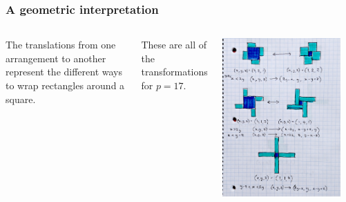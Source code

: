 \documentclass{beamer}
\begin{document}
\begin{frame}
	\frametitle{A geometric interpretation}
	\begin{columns}

	The translations from one arrangement to another represent the different ways to wrap
	rectangles around a square.

	\vspace{1ex}

	These are all of the transformations for $p=17$.


	\begin{center}
             \includegraphics[width=0.9\textwidth]{Zagier_involution_levels.jpg}
        \end{center}
	
	\end{columns}
\end{frame}

%
\end{document}
